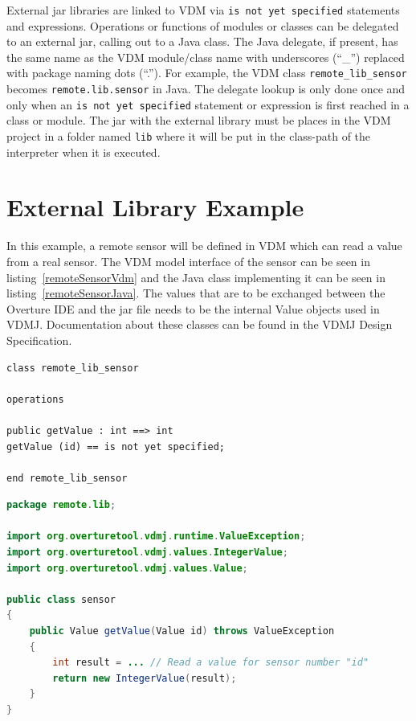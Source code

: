 \documentclass{overturerepchap}
\begin{document}
External jar libraries are linked to VDM via
\texttt{is not yet specified} statements and expressions. Operations
or functions of modules or classes can be delegated to an external
jar, calling out to a Java class. The Java delegate, if present, has
the same name as the VDM
module/class name with underscores (``\_'') replaced with package naming
dots (``.''). For example, the VDM class \texttt{remote\_lib\_sensor} becomes
\texttt{remote.lib.sensor} in Java. The delegate lookup is only done once and
only when an \texttt{is not yet specified} statement or expression is first
reached in a class or module. The jar with the external library must be places in
the VDM project in a folder named \texttt{lib} where it will be put in the
class-path of the interpreter when it is executed.

\section{External Library Example}

In this example, a remote sensor will be defined in VDM which can read a
value from a real sensor. The VDM model interface of the sensor can be
seen in listing~\ref{remoteSensorVdm} and the Java class
implementing it can be seen in listing~\ref{remoteSensorJava}. The
values that are to be exchanged between the Overture IDE and the jar
file needs to be the internal Value objects used in VDMJ. Documentation about
these classes can be found in the VDMJ Design Specification\cite{Battle10}.

\begin{lstlisting}[language=VDM++,label=remoteSensorVdm,caption=Remote sensor VDM class,captionpos=b]
class remote_lib_sensor

operations

public getValue : int ==> int
getValue (id) == is not yet specified;

end remote_lib_sensor
\end{lstlisting}


\begin{lstlisting}[language=JAVA,label=remoteSensorJava,caption=Remote sensor Java class,captionpos=b]
package remote.lib;

import org.overturetool.vdmj.runtime.ValueException;
import org.overturetool.vdmj.values.IntegerValue;
import org.overturetool.vdmj.values.Value;

public class sensor
{
	public Value getValue(Value id) throws ValueException
	{
		int result = ... // Read a value for sensor number "id"
		return new IntegerValue(result);
	}
}
\end{lstlisting}
\end{document}
